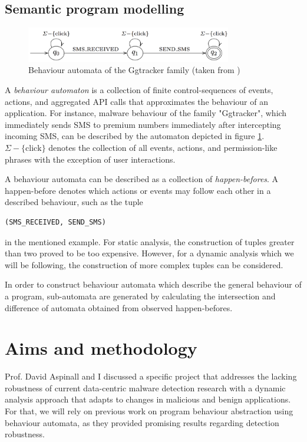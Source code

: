 \documentclass[11pt]{article}
\begin{document}
\subsection{Semantic program modelling}


\begin{figure}
\centering
\includegraphics[width=0.8\textwidth]{Behaviourautomata.png}
\caption{Behaviour automata of the Ggtracker family (taken from \cite{chen2016robust})}
\label{aut}
\end{figure}


A \textit{behaviour automaton} is a collection  of  finite  control-sequences  of  events,  actions,  and aggregated API calls that approximates the behaviour of an application. For instance, malware behaviour of the family "Ggtracker", which immediately sends SMS to premium numbers immediately after intercepting incoming SMS, can be described by the automaton depicted in figure \ref{aut}.  $\Sigma - \{\text{click}\}$ denotes the collection of all events,  actions,  and permission-like phrases with the exception of user interactions.

A behaviour automata can be described as a collection of \textit{happen-befores}. A happen-before denotes which actions or events may follow each other in a described behaviour, such as the tuple \begin{verbatim}
(SMS_RECEIVED, SEND_SMS)
\end{verbatim}
in the mentioned example. For static analysis, the construction of tuples greater than two proved to be too expensive. However, for a dynamic analysis which we will be following, the construction of more complex tuples can be considered. 

In order to construct behaviour automata which describe the general behaviour of a program, sub-automata are generated by calculating the intersection and difference of automata obtained from observed happen-befores. 



\section{Aims and methodology}

Prof. David Aspinall and I discussed a specific project that addresses the lacking robustness of current data-centric malware detection research with a dynamic analysis approach that adapts to changes in malicious and benign applications. For that, we will rely on previous work on program behaviour abstraction using behaviour automata, as they provided promising results regarding detection robustness. 
\end{document}
